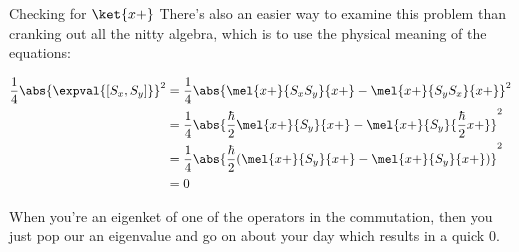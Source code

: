 \begin{answer}
\begin{answerpart}{Checking for \texorpdfstring{$\ket{x+}$}{|x+>}}
    There's also an easier way to examine this problem than cranking
    out all the nitty algebra, which is to use the physical meaning of
    the equations:

    \begin{equation}
      \begin{split}
        \frac{1}{4}\abs{\expval{[S_x, S_y]}}^2
        &=
        \frac{1}{4}
        \abs{
          \mel{x+}{S_xS_y}{x+}
          - \mel{x+}{S_yS_x}{x+}
        }^2
        \\
        &=
        \frac{1}{4}
        \abs{
          \frac{\hbar}{2}\mel{x+}{S_y}{x+}
          - \mel{x+}{S_y}{\frac{\hbar}{2}x+}
        }^2
        \\
        &=
        \frac{1}{4}
        \abs{
          \frac{\hbar}{2}(\mel{x+}{S_y}{x+} - \mel{x+}{S_y}{x+})
        }^2
        \\
        &= 0\\
      \end{split}
    \end{equation}

    When you're an eigenket of one of the operators in the
    commutation, then you just pop our an eigenvalue and go on about
    your day which results in a quick 0.
  \end{answerpart}

\end{answer}
